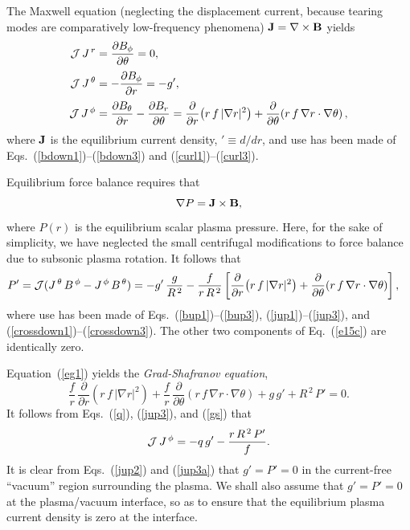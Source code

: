 \documentclass[12pt,prb,aps]{revtex4-1}
\begin{document}
The Maxwell equation (neglecting the displacement current, because tearing modes are comparatively low-frequency phenomena)
${\bf J}= \nabla\times{\bf B}$
yields
\begin{align}
{\cal J}\,J^{\,r} &= \frac{\partial B_\phi}{\partial \theta} =0,\label{jup1}\\[0.5ex]
{\cal J}\,J^{\,\theta} &= -\frac{\partial B_\phi}{\partial r} = - g',\label{jup2}\\[0.5ex]
{\cal J}\,J^{\,\phi}&= \frac{\partial B_\theta}{\partial r} -\frac{\partial B_r}{\partial\theta}=\frac{\partial}{\partial r}\!\left(r\,f\,|\nabla r|^2\right)+ \frac{\partial}{\partial\theta}\!\left(r\,f\,\nabla r\cdot\nabla\theta\right),\label{jup3}
\end{align}
where ${\bf J}$ is the equilibrium current density, $'\equiv d/dr$, and use has been made of  Eqs.~(\ref{bdown1})--(\ref{bdown3}) and (\ref{curl1})--(\ref{curl3}).

Equilibrium force balance requires that
\begin{equation}\label{e15c}
 \nabla P={\bf J}\times {\bf B},
\end{equation}
where $P(r)$ is the equilibrium scalar plasma pressure. Here, for the sake of simplicity, we have neglected the small centrifugal modifications to force balance due to subsonic plasma
rotation.\cite{flow,flow1}
It follows that 
\begin{align}\label{eg1}
P'&= {\cal J}(J^{\,\theta}\,B^{\,\phi}-J^{\,\phi}\,B^{\,\theta})= -g'\,\frac{g}{R^{\,2}} - \frac{f}{r\,R^{\,2}}\left[\frac{\partial}{\partial r}\!\left(r\,f\,|\nabla r|^2\right)+ \frac{\partial}{\partial\theta}\!\left(r\,f\,\nabla r\cdot\nabla\theta\right)\right],
\end{align}
where use has been made of Eqs.~(\ref{bup1})--(\ref{bup3}),  (\ref{jup1})--(\ref{jup3}), and (\ref{crossdown1})--(\ref{crossdown3}). The
other two components of Eq.~(\ref{e15c}) are identically zero. 

Equation~(\ref{eg1}) yields the {\em Grad-Shafranov equation},\cite{gs1}
\begin{equation}\label{gs}
\frac{f}{r}\,\frac{\partial}{\partial r}\!\left(r\,f\,|\nabla r|^2\right) +\frac{f}{r}\,\frac{\partial}{\partial\theta}\!\left(r\,f\,\nabla r\cdot\nabla\theta\right)+g\,g' + R^{\,2}\,P'=0.
\end{equation}
It follows from Eqs.~(\ref{q}), (\ref{jup3}), and (\ref{gs}) that
\begin{equation}\label{jup3a}
{\cal J}\,J^{\,\phi} = -q\,g' - \frac{r\,R^{\,2}\,P'}{f}.
\end{equation}
It is clear from Eqs.~(\ref{jup2}) and (\ref{jup3a}) that $g'=P'=0$ in the  current-free ``vacuum'' region surrounding the plasma.
We shall also assume that $g'=P'=0$ at the plasma/vacuum interface, so as to ensure that the equilibrium plasma
current density is zero at the interface. 
\end{document}
